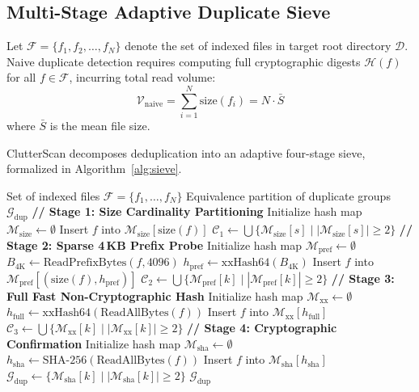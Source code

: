 \documentclass[journal,compsoc,10pt,twocolumn]{IEEEtran}
\begin{document}
\subsection{Multi-Stage Adaptive Duplicate Sieve}
Let $\mathcal{F} = \{f_1, f_2, \dots, f_N\}$ denote the set of indexed files in target root directory $\mathcal{D}$. Naive duplicate detection requires computing full cryptographic digests $\mathcal{H}(f)$ for all $f \in \mathcal{F}$, incurring total read volume:
\begin{equation}
\mathcal{V}_{\text{naive}} = \sum_{i=1}^N \text{size}(f_i) = N \cdot \bar{S}
\end{equation}
where $\bar{S}$ is the mean file size.

ClutterScan decomposes deduplication into an adaptive four-stage sieve, formalized in Algorithm~\ref{alg:sieve}.

\begin{algorithm}[H]
\caption{ClutterScan Adaptive Multi-Stage Sieve}
\label{alg:sieve}
\begin{algorithmic}[1]
\REQUIRE Set of indexed files $\mathcal{F} = \{f_1, \dots, f_N\}$
\ENSURE Equivalence partition of duplicate groups $\mathcal{G}_{\text{dup}}$
\STATE \textbf{// Stage 1: Size Cardinality Partitioning}
\STATE Initialize hash map $\mathcal{M}_{\text{size}} \leftarrow \emptyset$
    \STATE Insert $f$ into $\mathcal{M}_{\text{size}}[\text{size}(f)]$
\ENDFOR
\STATE $\mathcal{C}_1 \leftarrow \bigcup \{ \mathcal{M}_{\text{size}}[s] \mid |\mathcal{M}_{\text{size}}[s]| \ge 2 \}$
\STATE \textbf{// Stage 2: Sparse 4\,KB Prefix Probe}
\STATE Initialize hash map $\mathcal{M}_{\text{pref}} \leftarrow \emptyset$
    \STATE $B_{4\text{K}} \leftarrow \text{ReadPrefixBytes}(f, 4096)$
    \STATE $h_{\text{pref}} \leftarrow \text{xxHash64}(B_{4\text{K}})$
    \STATE Insert $f$ into $\mathcal{M}_{\text{pref}}[(\text{size}(f), h_{\text{pref}})]$
\ENDFOR
\STATE $\mathcal{C}_2 \leftarrow \bigcup \{ \mathcal{M}_{\text{pref}}[k] \mid |\mathcal{M}_{\text{pref}}[k]| \ge 2 \}$
\STATE \textbf{// Stage 3: Full Fast Non-Cryptographic Hash}
\STATE Initialize hash map $\mathcal{M}_{\text{xx}} \leftarrow \emptyset$
    \STATE $h_{\text{full}} \leftarrow \text{xxHash64}(\text{ReadAllBytes}(f))$
    \STATE Insert $f$ into $\mathcal{M}_{\text{xx}}[h_{\text{full}}]$
\ENDFOR
\STATE $\mathcal{C}_3 \leftarrow \bigcup \{ \mathcal{M}_{\text{xx}}[k] \mid |\mathcal{M}_{\text{xx}}[k]| \ge 2 \}$
\STATE \textbf{// Stage 4: Cryptographic Confirmation}
\STATE Initialize hash map $\mathcal{M}_{\text{sha}} \leftarrow \emptyset$
    \STATE $h_{\text{sha}} \leftarrow \text{SHA-256}(\text{ReadAllBytes}(f))$
    \STATE Insert $f$ into $\mathcal{M}_{\text{sha}}[h_{\text{sha}}]$
\ENDFOR
\STATE $\mathcal{G}_{\text{dup}} \leftarrow \{ \mathcal{M}_{\text{sha}}[k] \mid |\mathcal{M}_{\text{sha}}[k]| \ge 2 \}$
\RETURN $\mathcal{G}_{\text{dup}}$
\end{algorithmic}
\end{algorithm}
\end{document}
